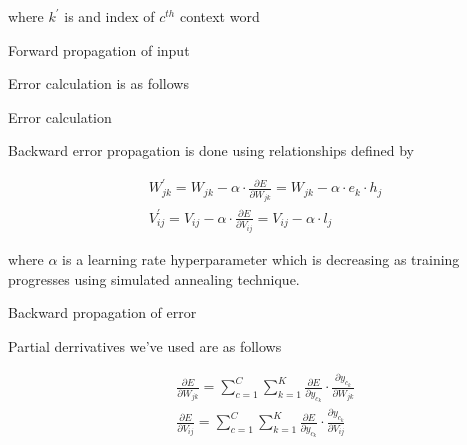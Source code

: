 \documentclass{article}
\newcommand{\SetAlgoStyle}{
	\SetAlgoNoLine
	\SetAlgoNoEnd
	\DontPrintSemicolon
}
\begin{document}
where $k^\prime$ is and index of $c^{th}$ context word

\begin{algorithm}[H]
	\caption{Forward propagation of input}
	\SetAlgoStyle
\end{algorithm}

Error calculation is as follows

\begin{algorithm}[H]
	\caption{Error calculation}
	\SetAlgoStyle
\end{algorithm}

Backward error propagation is done using relationships defined by

\begin{align}
	&W_{jk}^\prime = W_{jk} - \alpha \cdot \frac{\partial E}{\partial W_{jk}} =
	W_{jk} - \alpha \cdot e_k \cdot h_j \\
	&V_{ij}^\prime = V_{ij} - \alpha \cdot \frac{\partial E}{\partial V_{ij}} =
	V_{ij} - \alpha \cdot l_j
\end{align}

where $\alpha$ is a learning rate hyperparameter which is decreasing as
training progresses using simulated annealing technique.

\begin{algorithm}[H]
	\caption{Backward propagation of error}
	\SetAlgoStyle
\end{algorithm}

Partial derrivatives we've used are as follows

\begin{align}	
	&\frac{\partial E}{\partial W_{jk}} = \sum_{c=1}^C \sum_{k=1}^K
	\frac{\partial E}{\partial y_{c_k}} \cdot \frac{\partial y_{c_k}}{\partial
	W_{jk}} \\
	&\frac{\partial E}{\partial V_{ij}} = \sum_{c=1}^C \sum_{k=1}^K
	\frac{\partial E}{\partial y_{c_k}} \cdot \frac{\partial y_{c_k}}{\partial
	V_{ij}}
\end{align}
\end{document}
